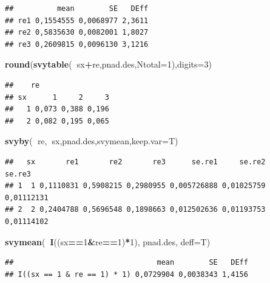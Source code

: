 \documentclass[]{book}
\newenvironment{Shaded}{\begin{snugshade}}{\end{snugshade}}
\newcommand{\KeywordTok}[1]{\textcolor[rgb]{0.13,0.29,0.53}{\textbf{#1}}}
\newcommand{\DataTypeTok}[1]{\textcolor[rgb]{0.13,0.29,0.53}{#1}}
\newcommand{\DecValTok}[1]{\textcolor[rgb]{0.00,0.00,0.81}{#1}}
\newcommand{\OperatorTok}[1]{\textcolor[rgb]{0.81,0.36,0.00}{\textbf{#1}}}
\newcommand{\NormalTok}[1]{#1}
\theoremstyle{definition}
\theoremstyle{definition}
\theoremstyle{definition}
\theoremstyle{remark}
\begin{document}
\begin{verbatim}
##          mean        SE   DEff
## re1 0,1554555 0,0068977 2,3611
## re2 0,5835630 0,0082001 1,8027
## re3 0,2609815 0,0096130 3,1216
\end{verbatim}

\begin{Shaded}
\begin{Highlighting}[]
\KeywordTok{round}\NormalTok{(}\KeywordTok{svytable}\NormalTok{(}\OperatorTok{~}\NormalTok{sx}\OperatorTok{+}\NormalTok{re,pnad.des,}\DataTypeTok{Ntotal=}\DecValTok{1}\NormalTok{),}\DataTypeTok{digits=}\DecValTok{3}\NormalTok{)}
\end{Highlighting}
\end{Shaded}

\begin{verbatim}
##    re
## sx      1     2     3
##   1 0,073 0,388 0,196
##   2 0,082 0,195 0,065
\end{verbatim}

\begin{Shaded}
\begin{Highlighting}[]
\KeywordTok{svyby}\NormalTok{(}\OperatorTok{~}\NormalTok{re,}\OperatorTok{~}\NormalTok{sx,pnad.des,svymean,}\DataTypeTok{keep.var=}\NormalTok{T)}
\end{Highlighting}
\end{Shaded}

\begin{verbatim}
##   sx       re1       re2       re3      se.re1     se.re2     se.re3
## 1  1 0,1110831 0,5908215 0,2980955 0,005726888 0,01025759 0,01112131
## 2  2 0,2404788 0,5696548 0,1898663 0,012502636 0,01193753 0,01114102
\end{verbatim}

\begin{Shaded}
\begin{Highlighting}[]
\KeywordTok{svymean}\NormalTok{(}\OperatorTok{~}\KeywordTok{I}\NormalTok{((sx}\OperatorTok{==}\DecValTok{1}\OperatorTok{&}\NormalTok{re}\OperatorTok{==}\DecValTok{1}\NormalTok{)}\OperatorTok{*}\DecValTok{1}\NormalTok{), pnad.des, }\DataTypeTok{deff=}\NormalTok{T)}
\end{Highlighting}
\end{Shaded}

\begin{verbatim}
##                                 mean        SE   DEff
## I((sx == 1 & re == 1) * 1) 0,0729904 0,0038343 1,4156
\end{verbatim}
\end{document}
